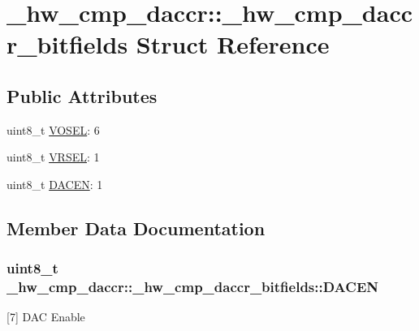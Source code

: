\hypertarget{struct__hw__cmp__daccr_1_1__hw__cmp__daccr__bitfields}{}\section{\+\_\+hw\+\_\+cmp\+\_\+daccr\+:\+:\+\_\+hw\+\_\+cmp\+\_\+daccr\+\_\+bitfields Struct Reference}
\label{struct__hw__cmp__daccr_1_1__hw__cmp__daccr__bitfields}
\subsection*{Public Attributes}
\begin{DoxyCompactItemize}
\item 
uint8\+\_\+t \hyperlink{struct__hw__cmp__daccr_1_1__hw__cmp__daccr__bitfields_a013e05c90d2126da62c8a3d1b87dc918}{V\+O\+S\+EL}\+: 6
\item 
uint8\+\_\+t \hyperlink{struct__hw__cmp__daccr_1_1__hw__cmp__daccr__bitfields_af52c1d21824bf8dfa477140189968bde}{V\+R\+S\+EL}\+: 1
\item 
uint8\+\_\+t \hyperlink{struct__hw__cmp__daccr_1_1__hw__cmp__daccr__bitfields_a63d068c0d0f068ac8900474dd9f168f7}{D\+A\+C\+EN}\+: 1
\end{DoxyCompactItemize}


\subsection{Member Data Documentation}
\subsubsection[{\texorpdfstring{D\+A\+C\+EN}{DACEN}}]{\setlength{\rightskip}{0pt plus 5cm}uint8\+\_\+t \+\_\+hw\+\_\+cmp\+\_\+daccr\+::\+\_\+hw\+\_\+cmp\+\_\+daccr\+\_\+bitfields\+::\+D\+A\+C\+EN}\hypertarget{struct__hw__cmp__daccr_1_1__hw__cmp__daccr__bitfields_a63d068c0d0f068ac8900474dd9f168f7}{}\label{struct__hw__cmp__daccr_1_1__hw__cmp__daccr__bitfields_a63d068c0d0f068ac8900474dd9f168f7}
\mbox{[}7\mbox{]} D\+AC Enable 
